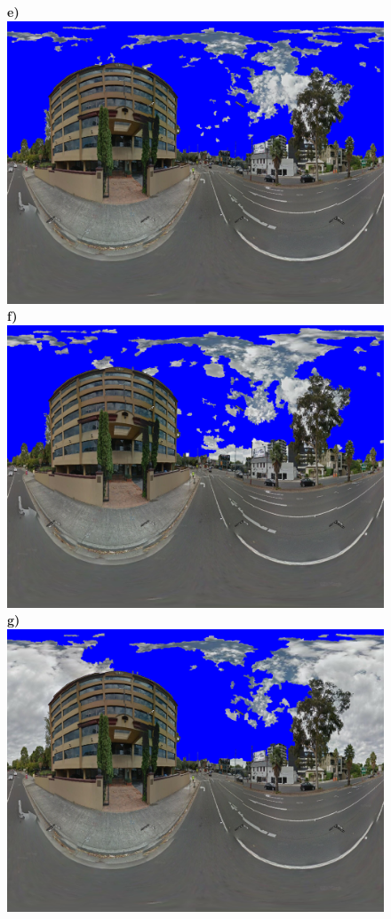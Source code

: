 \documentclass[final,3p,times,authoryear]{elsarticle}
\begin{document}
\begin{figure}
\textbf{e)}\includegraphics[scale=0.08]{Images/mean/4880_3_6_100_ms_sky_mark.png} 
\textbf{f)}\includegraphics[scale=0.08]{Images/mean/4880_7_6_100_ms_sky_mark.png} 
\textbf{g)}\includegraphics[scale=0.08]{Images/mean/4880_5_7_210_ms_sky_mark.png} 

\end{figure}
\end{document}
